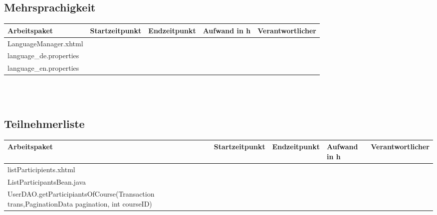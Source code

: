 \begin{landscape}
	\subsection{Mehrsprachigkeit}
	\begin{tabular}{|p{10cm}|p{4cm}|p{3cm}|p{3cm}|p{3cm}|}
		\hline  \textbf{Arbeitspaket} & \textbf{Startzeitpunkt} & \textbf{Endzeitpunkt} & \textbf{Aufwand in h} & \textbf{Verantwortlicher} \\ 
		\hline   LanguageManager.xhtml                                 &                            &                             &                     &\\
		\hline   language\_de.properties                               &                            &                             &                     &\\
		\hline   language\_en.properties                               &                            &                             &                     &\\
		\hline 
	\end{tabular} \ \\
	\ \\
	
	\subsection{Teilnehmerliste}
	\begin{tabular}{|p{10cm}|p{4cm}|p{3cm}|p{3cm}|p{3cm}|}
		\hline  \textbf{Arbeitspaket} & \textbf{Startzeitpunkt} & \textbf{Endzeitpunkt} & \textbf{Aufwand in h} & \textbf{Verantwortlicher} \\ 
		\hline   listParticipients.xhtml                                     &                            &                             &                     &\\
		\hline   ListParticipantsBean.java                                   &                            &                             &                     &\\
		\hline   UserDAO.getParticipiantsOfCourse(Transaction trans,PaginationData pagination, int courseID)  &                            &                             &                     &\\
		\hline 
	\end{tabular} \ \\
	\ \\
	

\end{landscape}
